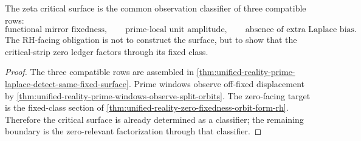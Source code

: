 \begin{theorem}
\label{thm:unified-reality-observation-classified-critical-surface-principle}
The zeta critical surface is the common observation classifier of three
compatible rows:
$$
\text{functional mirror fixedness},
\qquad
\text{prime-local unit amplitude},
\qquad
\text{absence of extra Laplace bias}.
$$
The RH-facing obligation is not to construct the surface, but to show
that the critical-strip zero ledger factors through its fixed class.
\end{theorem}

\begin{proof}
The three compatible rows are assembled in
\autoref{thm:unified-reality-prime-laplace-detect-same-fixed-surface}.
Prime windows observe off-fixed displacement by
\autoref{thm:unified-reality-prime-windows-observe-split-orbits}.  The
zero-facing target is the fixed-class section of
\autoref{thm:unified-reality-zero-fixedness-orbit-form-rh}.  Therefore
the critical surface is already determined as a classifier; the
remaining boundary is the zero-relevant factorization through that
classifier.
\end{proof}
